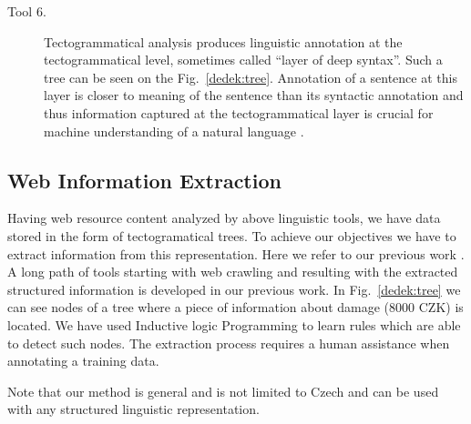 \begin{multicols}{2}
\begin{description}
	\item[Tool 6.] Tectogrammatical analysis produces linguistic annotation
at the tectogrammatical level, sometimes called
``layer of deep syntax''. Such a tree can be seen on
the Fig.~\ref{dedek:tree}. Annotation of a sentence at this layer
is closer to meaning of the sentence than its syntactic
annotation and thus information captured at the tectogrammatical
layer is crucial for machine understanding
of a natural language \cite{dedek:KlTransformationBasedTectogrammatical2006}.
\end{description}

\subsection{Web Information Extraction}

Having web resource content analyzed by above linguistic tools, we have data stored in the form of tectogramatical trees. To achieve our objectives we have to extract information from this representation. 
Here we refer to our previous work \cite{dedek:DeVoLinguisticextraction2008,dedek:DeVoComputingaggregations2008,dedek:DeEcExperimentswith2008}. A long path of tools starting with web crawling and resulting with the extracted structured information is developed in our previous work. 
In Fig.~\ref{dedek:tree} we can see nodes of a tree where a piece of information about damage (8000 CZK) is located. We have used Inductive logic Programming to learn rules which are able to detect such nodes. 
The extraction process requires a human assistance when annotating a training data.

Note that our method is general and is not limited to Czech and can be used with any structured linguistic representation. 



\end{multicols}
